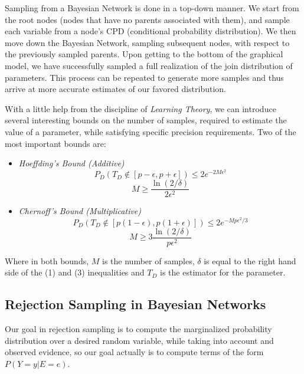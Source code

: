 \documentclass{article}
\begin{document}
    Sampling from a Bayesian Network is done in a top-down manner. We start from the root nodes (nodes that have no parents associated with them), and sample each variable from a node's CPD (conditional probability distribution). We then move down the Bayesian Network, sampling subsequent nodes, with respect to the previously sampled parents. Upon getting to the bottom of the graphical model, we have successfully sampled a full realization of the join distribution of parameters. This process can be repeated to generate more samples and thus arrive at more accurate estimates of our favored distribution.

    With a little help from the discipline of \textit{Learning Theory}, we can introduce several interesting bounds on the number of samples, required to estimate the value of a parameter, while satisfying specific precision requirements. Two of the most important bounds are:

    \begin{itemize}
        \item \textit{Hoeffding's Bound (Additive)}
            \begin{equation}
                P_D (T_D \notin [p-\epsilon, p+\epsilon]) \leq 2e^{-2M\epsilon^2}
            \end{equation}
            \begin{equation}
                M \geq \frac{\ln(2/\delta)}{2\epsilon^2}
            \end{equation}
        \item \textit{Chernoff's Bound (Multiplicative)}
            \begin{equation}
                P_D (T_D \notin [p(1-\epsilon), p(1+\epsilon)]) \leq 2e^{-Mp\epsilon^2/3}
            \end{equation}
            \begin{equation}
                M \geq 3\frac{\ln(2/\delta)}{p\epsilon^2}
            \end{equation}
    \end{itemize}

    Where in both bounds, $M$ is the number of samples, $\delta$ is equal to the right hand side of the (1) and (3) inequalities and $T_D$ is the estimator for the parameter.


\subsection{Rejection Sampling in Bayesian Networks}
    Our goal in rejection sampling is to compute the marginalized probability distribution over a desired random variable, while taking into account and observed evidence, so our goal actually is to compute terms of the form $P(Y=y | E=e)$.
\end{document}
